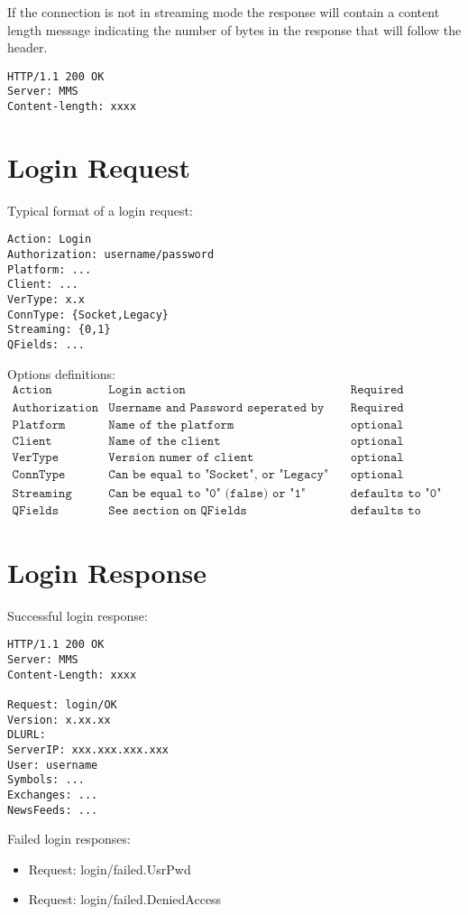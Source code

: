 \documentclass[12pt,twoside,letterpaper]{report}
\begin{document}
If the connection is not in streaming mode the response will contain a content length message indicating the number of bytes in the response that will follow the header.
\begin{verbatim}
HTTP/1.1 200 OK
Server: MMS
Content-length: xxxx
\end{verbatim}

\section*{Login Request}
Typical format of a login request:
\begin{verbatim}
Action: Login
Authorization: username/password
Platform: ...
Client: ...
VerType: x.x
ConnType: {Socket,Legacy}
Streaming: {0,1}
QFields: ...
\end{verbatim}

Options definitions:
$$
\begin{array}{lll}
\texttt{Action} & \texttt{Login action} & \texttt{Required} \\
\texttt{Authorization} & \texttt{Username and Password seperated by "/"} & \texttt{Required} \\
\texttt{Platform} & \texttt{Name of the platform} & \texttt{optional} \\
\texttt{Client} & \texttt{Name of the client} & \texttt{optional} \\
\texttt{VerType} & \texttt{Version numer of client} & \texttt{optional} \\
\texttt{ConnType} & \texttt{Can be equal to "Socket", or "Legacy"} & \texttt{optional} \\
\texttt{Streaming} & \texttt{Can be equal to "0" (false) or "1" (true)} & \texttt{defaults to "0"} \\
\texttt{QFields} & \texttt{See section on QFields} & \texttt{defaults to empty}
\end{array}
$$

\section*{Login Response}
Successful login response:
\begin{verbatim}
HTTP/1.1 200 OK
Server: MMS
Content-Length: xxxx

Request: login/OK
Version: x.xx.xx
DLURL: 
ServerIP: xxx.xxx.xxx.xxx
User: username
Symbols: ...
Exchanges: ...
NewsFeeds: ...
\end{verbatim}

Failed login responses:
\begin{itemize}
\item Request: login/failed.UsrPwd
\item Request: login/failed.DeniedAccess
\end{itemize}
\end{document}
